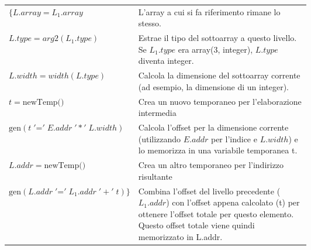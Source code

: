 \documentclass[11pt]{article}
\begin{document}
\begin{center}
  \begin{tabularx}{\linewidth}{l m{0.6\linewidth}}
  $\{L.array = L_1.array$
      & \small L'array a cui si fa riferimento rimane lo stesso. \\[0.3cm]
  
  $L.type = arg2(L_1.type)$
      & \small Estrae il tipo del sottoarray a questo livello. Se $L_1.type$ era array(3, integer), $L.type$ diventa integer. \\[0.3cm]
  
  $ L.width = width(L.type) $
      & \small Calcola la dimensione del sottoarray corrente (ad esempio, la dimensione di un integer).\\[0.3cm]
  
  $ t = \text{newTemp()} $
      & \small Crea un nuovo temporaneo per l'elaborazione intermedia \\[0.3cm]
  
  $ \text{gen}(t \;'\mathord{=}'\; E.addr \;'*'\; L.width)$
      & \small Calcola l'offset per la dimensione corrente (utilizzando $E.addr$ per l'indice e $L.width$) e lo memorizza in una variabile temporanea t. \\[0.3cm]
  
  $ L.addr = \text{newTemp()} $
      & \small Crea un altro temporaneo per l'indirizzo risultante \\[0.3cm]
  
  $ \text{gen}(L.addr \;'\mathord{=}'\; L_1.addr \;'+'\; t )\}$
      & \small Combina l'offset del livello precedente ($L_1.addr$) con l'offset appena calcolato (t) per ottenere l'offset totale per questo elemento. Questo offset totale viene quindi memorizzato in L.addr. \\
  \end{tabularx}  
\end{center}
\end{document}
